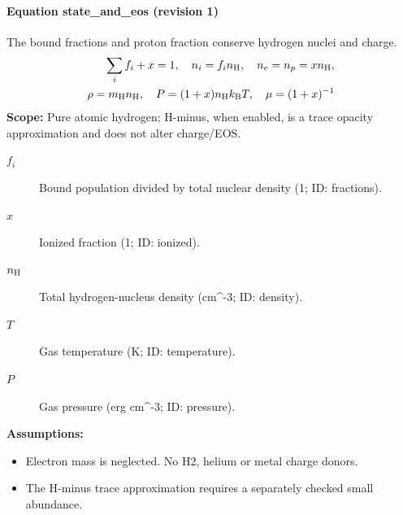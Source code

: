 
\paragraph{Equation state\_and\_eos (revision 1)}
The bound fractions and proton fraction conserve hydrogen nuclei and charge.
\begin{equation}
\begin{aligned}
\sum_i f_i+x=1,\quad n_i=f_i n_{\rm H},\quad n_e=n_p=xn_{\rm H},\\\rho=m_{\rm H}n_{\rm H},\quad P=(1+x)n_{\rm H}k_{\rm B}T,\quad \mu=(1+x)^{-1}
\end{aligned}
\label{eq:escape.coupled_5f_hydrogen:state_5f_and_5f_eos:1}
\end{equation}
\noindent\textbf{Scope:} Pure atomic hydrogen; H-minus, when enabled, is a trace opacity approximation and does not alter charge/EOS.

\begin{description}
\item[$f_i$] Bound population divided by total nuclear density (1; ID: fractions).
\item[$x$] Ionized fraction (1; ID: ionized).
\item[$n_{\rm H}$] Total hydrogen-nucleus density (cm\textasciicircum{}-3; ID: density).
\item[$T$] Gas temperature (K; ID: temperature).
\item[$P$] Gas pressure (erg cm\textasciicircum{}-3; ID: pressure).
\end{description}

\noindent\textbf{Assumptions:}
\begin{itemize}
\item Electron mass is neglected. No H2, helium or metal charge donors.
\item The H-minus trace approximation requires a separately checked small abundance.
\end{itemize}

